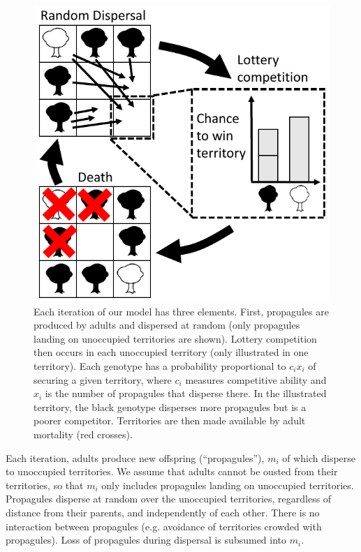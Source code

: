\documentclass[11pt]{article}
\begin{document}
\begin{figure}
\centering
\includegraphics[scale=0.8]{lottery.pdf}
\caption{\label{fig:lottery} Each iteration of our model has three elements. First, propagules are produced by adults and dispersed at random (only propagules landing on unoccupied territories are shown). Lottery competition then occurs in each unoccupied territory (only illustrated in one territory). Each genotype has a probability proportional to $c_i x_i$ of securing a given territory, where $c_i$ measures competitive ability and $x_i$ is the number of propagules that disperse there. In the illustrated territory, the black genotype disperses more propagules but is a poorer competitor. Territories are then made available by adult mortality (red crosses).}
\end{figure}

Each iteration, adults produce new offspring (``propagules''), $m_i$ of which disperse to unoccupied territories. We assume that adults cannot be ousted from their territories, so that $m_i$ only includes propagules landing on unoccupied territories. Propagules disperse at random over the unoccupied territories, regardless of distance from their parents, and independently of each other. There is no interaction between propagules (e.g. avoidance of territories crowded with propagules). Loss of propagules during dispersal is subsumed into $m_i$. 
\end{document}
